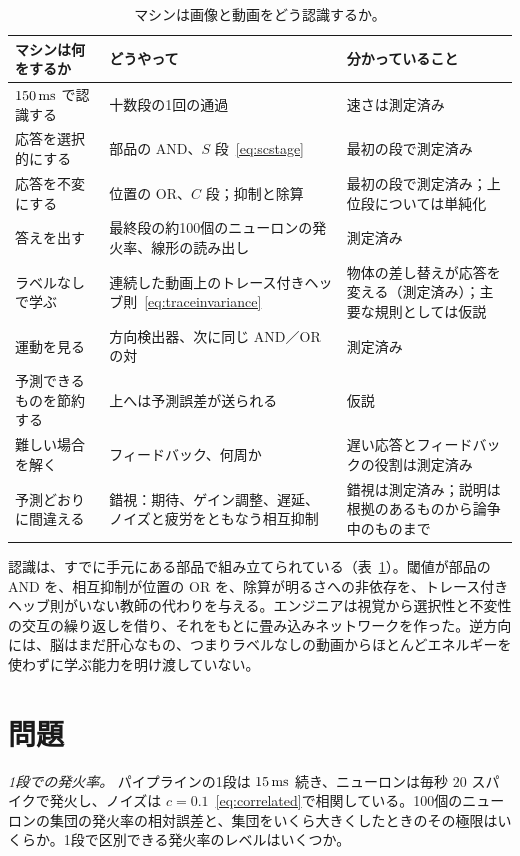 \begin{table}[t]
\centering
\footnotesize
\setlength{\tabcolsep}{4pt}
\renewcommand{\arraystretch}{1.15}
\begin{tabular}{>{\raggedright}p{3.0cm}>{\raggedright}p{4.6cm}>{\raggedright\arraybackslash}p{5.2cm}}
\toprule
マシンは何をするか & どうやって & 分かっていること \\
\midrule
$150\,\text{ms}$ で認識する & 十数段の1回の通過 & 速さは測定済み \\
応答を選択的にする & 部品の AND、$S$ 段~\eqref{eq:scstage} & 最初の段で測定済み \\
応答を不変にする & 位置の OR、$C$ 段；抑制と除算 & 最初の段で測定済み；上位段については単純化 \\
答えを出す & 最終段の約100個のニューロンの発火率、線形の読み出し & 測定済み \\
ラベルなしで学ぶ & 連続した動画上のトレース付きヘッブ則~\eqref{eq:traceinvariance} & 物体の差し替えが応答を変える（測定済み）；主要な規則としては仮説 \\
運動を見る & 方向検出器、次に同じ AND／OR の対 & 測定済み \\
予測できるものを節約する & 上へは予測誤差が送られる & 仮説 \\
難しい場合を解く & フィードバック、何周か & 遅い応答とフィードバックの役割は測定済み \\
予測どおりに間違える & 錯視：期待、ゲイン調整、遅延、ノイズと疲労をともなう相互抑制 & 錯視は測定済み；説明は根拠のあるものから論争中のものまで \\
\bottomrule
\end{tabular}
\caption{マシンは画像と動画をどう認識するか。}
\label{tab:recognition}
\end{table}

認識は、すでに手元にある部品で組み立てられている（表~\ref{tab:recognition}）。閾値が部品の AND を、相互抑制が位置の OR を、除算が明るさへの非依存を、トレース付きヘッブ則がいない教師の代わりを与える。エンジニアは視覚から選択性と不変性の交互の繰り返しを借り、それをもとに畳み込みネットワークを作った。逆方向には、脳はまだ肝心なもの、つまりラベルなしの動画からほとんどエネルギーを使わずに学ぶ能力を明け渡していない。

\section{問題}

\begin{exercise}[\lvlA]
\label{ex:12:1}
\emph{1段での発火率。} パイプラインの1段は $15\,\text{ms}$ 続き、ニューロンは毎秒 $20$ スパイクで発火し、ノイズは $c=0.1$~\eqref{eq:correlated}で相関している。100個のニューロンの集団の発火率の相対誤差と、集団をいくら大きくしたときのその極限はいくらか。1段で区別できる発火率のレベルはいくつか。
\end{exercise}

